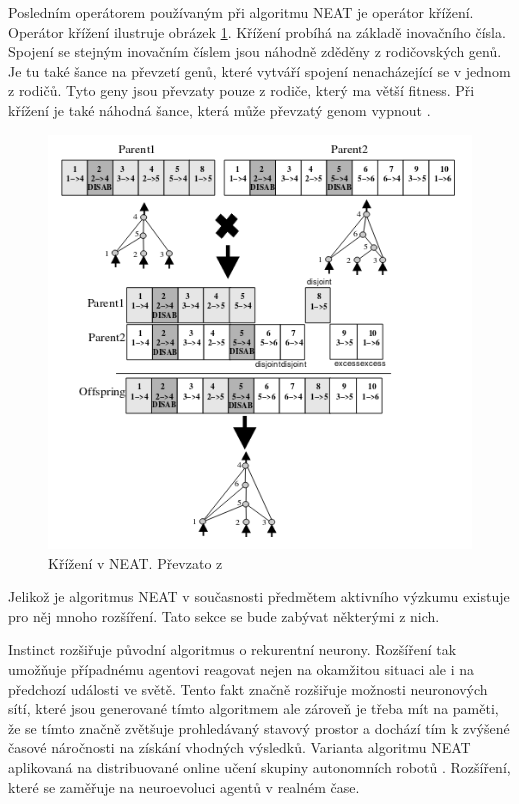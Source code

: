 Posledním operátorem používaným při algoritmu NEAT je operátor křížení. Operátor křížení ilustruje obrázek \ref{fig:neatcrossover}. Křížení probíhá na základě inovačního čísla. Spojení se stejným inovačním číslem jsou náhodně zděděny z rodičovských genů. Je tu také šance na převzetí genů, které vytváří spojení nenacházející se v jednom z rodičů. Tyto geny jsou převzaty pouze z rodiče, který ma větší fitness. Při křížení je také náhodná šance, která může převzatý genom vypnout \cite[s.~12]{NEAT}.

\begin{figure}[h!]
	\centering
	\includegraphics[width=0.6\linewidth]{neatCrossover}
	\caption{Křížení v NEAT. Převzato z \cite[s.~12]{NEAT}}
	\label{fig:neatcrossover}
\end{figure}

Jelikož je algoritmus NEAT v současnosti předmětem aktivního výzkumu existuje pro něj mnoho rozšíření. Tato sekce se bude zabývat některými z nich.

Instinct rozšiřuje původní algoritmus o rekurentní neurony. Rozšíření tak umožňuje případnému agentovi reagovat nejen na okamžitou situaci ale i na předchozí události ve světě. Tento fakt značně rozšiřuje možnosti neuronových sítí, které jsou generované tímto algoritmem ale zároveň je třeba mít na paměti, že se tímto značně zvětšuje prohledávaný stavový prostor a dochází tím k zvýšené časové náročnosti na získání vhodných výsledků.
Varianta algoritmu NEAT aplikovaná na distribuované online učení skupiny autonomních robotů \cite[s.~1]{odNEAT}.
Rozšíření, které se zaměřuje na neuroevoluci agentů v realném čase.


